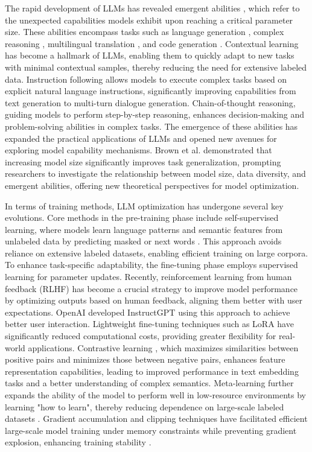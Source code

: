 The rapid development of LLMs has revealed emergent abilities \cite{wei2022emergent,10.5555/3600270.3602070}, which refer to the unexpected capabilities models exhibit upon reaching a critical parameter size. These abilities encompass tasks such as language generation \cite{10.5555/3524938.3525989}, complex reasoning \cite{10.5555/3600270.3602070}, multilingual translation \cite{aharoni-etal-2019-massively}, and code generation \cite{feng-etal-2020-codebert}. Contextual learning \cite{lu-etal-2024-emergent} has become a hallmark of LLMs, enabling them to quickly adapt to new tasks with minimal contextual samples, thereby reducing the need for extensive labeled data. Instruction following allows models to execute complex tasks based on explicit natural language instructions, significantly improving capabilities from text generation to multi-turn dialogue generation. Chain-of-thought reasoning, guiding models to perform step-by-step reasoning, enhances decision-making and problem-solving abilities in complex tasks. The emergence of these abilities has expanded the practical applications of LLMs and opened new avenues for exploring model capability mechanisms. Brown et al. \cite{NEURIPS2020_1457c0d6} demonstrated that increasing model size significantly improves task generalization, prompting researchers to investigate the relationship between model size, data diversity, and emergent abilities, offering new theoretical perspectives for model optimization.



In terms of training methods, LLM optimization has undergone several key evolutions. Core methods in the pre-training phase include self-supervised learning, where models learn language patterns and semantic features from unlabeled data by predicting masked or next words \cite{SU2024127063}. This approach avoids reliance on extensive labeled datasets, enabling efficient training on large corpora. To enhance task-specific adaptability, the fine-tuning phase employs supervised learning for parameter updates. Recently, reinforcement learning from human feedback (RLHF) \cite{lang-etal-2024-fine} has become a crucial strategy to improve model performance by optimizing outputs based on human feedback, aligning them better with user expectations. OpenAI developed InstructGPT \cite{NEURIPS2022_b1efde53} using this approach to achieve better user interaction. Lightweight fine-tuning techniques such as LoRA have significantly reduced computational costs, providing greater flexibility for real-world applications. Contrastive learning \cite{cheng-etal-2023-improving}, which maximizes similarities between positive pairs and minimizes those between negative pairs, enhances feature representation capabilities, leading to improved performance in text embedding tasks and a better understanding of complex semantics. Meta-learning further expands the ability of the model to perform well in low-resource environments by learning "how to learn", thereby reducing dependence on large-scale labeled datasets \cite{finn2017model}. Gradient accumulation and clipping techniques have facilitated efficient large-scale model training under memory constraints while preventing gradient explosion, enhancing training stability \cite{NEURIPS2023_8249b30d}.



